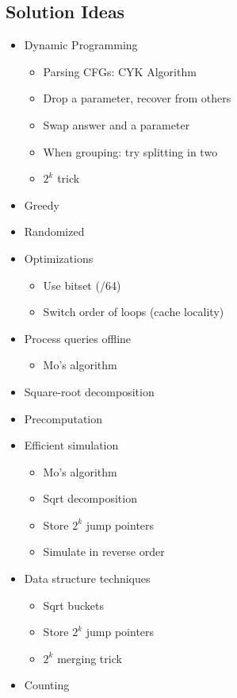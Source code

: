 \documentclass[9pt,a4paper,landscape,oneside]{amsart}
\newenvironment{myitemize}
{\begin{itemize}[leftmargin=.3cm]
	\setlength{\itemsep}{0pt}
	\setlength{\parskip}{0pt}
	\setlength{\parsep}{0pt}     }
{ \end{itemize}                  }
\begin{document}
\begin{multicols*}{3}
\subsection{Solution Ideas}
\begin{myitemize}
	\item Dynamic Programming
		\begin{myitemize}
			\item Parsing CFGs: CYK Algorithm
			\item Drop a parameter, recover from others
			\item Swap answer and a parameter
			\item When grouping: try splitting in two
			\item $2^k$ trick
		\end{myitemize}
	\item Greedy
	\item Randomized
	\item Optimizations
		\begin{myitemize}
			\item Use bitset (/64)
			\item Switch order of loops (cache locality)
		\end{myitemize}
	\item Process queries offline
		\begin{myitemize}
			\item Mo's algorithm
		\end{myitemize}
	\item Square-root decomposition
	\item Precomputation
	\item Efficient simulation
		\begin{myitemize}
			\item Mo's algorithm
			\item Sqrt decomposition
			\item Store $2^k$ jump pointers
			\item Simulate in reverse order
		\end{myitemize}
	\item Data structure techniques
		\begin{myitemize}
			\item Sqrt buckets
			\item Store $2^k$ jump pointers
			\item $2^k$ merging trick
		\end{myitemize}
	\item Counting
		\begin{myitemize}

\end{myitemize}
\end{myitemize}
\end{multicols*}
\end{document}
